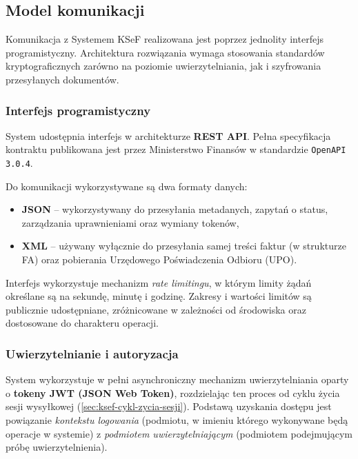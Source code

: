 \subsection{Model komunikacji}
\label{sec:ksef-model-komunikacji}

Komunikacja z Systemem KSeF realizowana jest poprzez jednolity interfejs programistyczny. Architektura rozwiązania wymaga stosowania standardów kryptograficznych zarówno na poziomie uwierzytelniania, jak i szyfrowania przesyłanych dokumentów. \cite{ksef-docs-przeglad}

\subsubsection{Interfejs programistyczny}
\label{sec:ksef-interfejs-programistyczny}

System udostępnia interfejs w architekturze \textbf{REST API}. Pełna specyfikacja kontraktu publikowana jest przez Ministerstwo Finansów w standardzie \texttt{OpenAPI 3.0.4}. 

Do komunikacji wykorzystywane są dwa formaty danych: \cite{ksef-weryfikacja-faktury}
\begin{itemize}
    \item \textbf{JSON} -- wykorzystywany do przesyłania metadanych, zapytań o status, zarządzania uprawnieniami oraz wymiany tokenów,
    \item \textbf{XML} -- używany wyłącznie do przesyłania samej treści faktur (w strukturze FA) oraz pobierania Urzędowego Poświadczenia Odbioru (UPO).
\end{itemize}

Interfejs wykorzystuje mechanizm \textit{rate limitingu}, w którym limity żądań określane są na sekundę, minutę i godzinę. Zakresy i wartości limitów są publicznie udostępniane, zróżnicowane w zależności od środowiska oraz dostosowane do charakteru operacji. \cite{ksef-docs-przeglad}

\subsubsection{Uwierzytelnianie i autoryzacja}
\label{sec:ksef-uwierzytelnianie-i-autoryzacja}

System wykorzystuje w pełni asynchroniczny mechanizm uwierzytelniania oparty o \textbf{tokeny JWT (JSON Web Token)}, rozdzielając ten proces od cyklu życia sesji wysyłkowej (\ref{sec:ksef-cykl-zycia-sesji}). Podstawą uzyskania dostępu jest powiązanie \textit{kontekstu logowania} (podmiotu, w imieniu którego wykonywane będą operacje w systemie) z \textit{podmiotem uwierzytelniającym} (podmiotem podejmującym próbę uwierzytelnienia). \cite{ksef-docs-przeglad}

